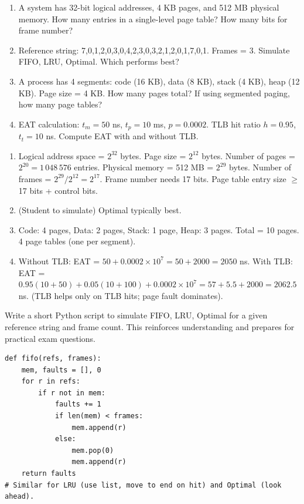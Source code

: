 \documentclass[11pt]{article}
\begin{document}
\begin{exercice}
\begin{enumerate}
\item A system has 32-bit logical addresses, 4 KB pages, and 512 MB physical memory. How many entries in a single-level page table? How many bits for frame number?
\item Reference string: 7,0,1,2,0,3,0,4,2,3,0,3,2,1,2,0,1,7,0,1. Frames = 3. Simulate FIFO, LRU, Optimal. Which performs best?
\item A process has 4 segments: code (16 KB), data (8 KB), stack (4 KB), heap (12 KB). Page size = 4 KB. How many pages total? If using segmented paging, how many page tables?
\item EAT calculation: $t_m = 50$ ns, $t_p = 10$ ms, $p = 0.0002$. TLB hit ratio $h = 0.95$, $t_t = 10$ ns. Compute EAT with and without TLB.
\end{enumerate}
\end{exercice}

\begin{corrige}[Exercise 1]
\begin{enumerate}
\item Logical address space = $2^{32}$ bytes. Page size = $2^{12}$ bytes. Number of pages = $2^{20} = 1\,048\,576$ entries. Physical memory = 512 MB = $2^{29}$ bytes. Number of frames = $2^{29}/2^{12} = 2^{17}$. Frame number needs 17 bits. Page table entry size $\ge$ 17 bits + control bits.
\item (Student to simulate) Optimal typically best.
\item Code: 4 pages, Data: 2 pages, Stack: 1 page, Heap: 3 pages. Total = 10 pages. 4 page tables (one per segment).
\item Without TLB: EAT = $50 + 0.0002 \times 10^7 = 50 + 2000 = 2050$ ns. With TLB: EAT = $0.95(10+50) + 0.05(10+100) + 0.0002 \times 10^7 = 57 + 5.5 + 2000 = 2062.5$ ns. (TLB helps only on TLB hits; page fault dominates).
\end{enumerate}
\end{corrige}

\begin{experience}
Write a short Python script to simulate FIFO, LRU, Optimal for a given reference string and frame count. This reinforces understanding and prepares for practical exam questions.
\begin{verbatim}
def fifo(refs, frames):
    mem, faults = [], 0
    for r in refs:
        if r not in mem:
            faults += 1
            if len(mem) < frames:
                mem.append(r)
            else:
                mem.pop(0)
                mem.append(r)
    return faults
# Similar for LRU (use list, move to end on hit) and Optimal (look ahead).
\end{verbatim}
\end{experience}
\end{document}

